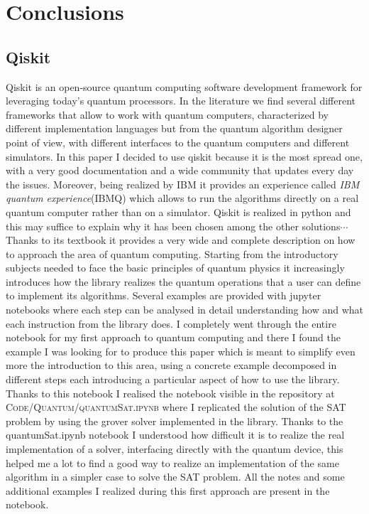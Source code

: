 \documentclass[english]{article}
\begin{document}
	\section{Conclusions}
	\label{sec:conclusions}
	
	\clearpage
	\begin{appendices}
		\section{Qiskit}
		\label{sec:qiskit}
			Qiskit is an open-source quantum computing software development framework for leveraging today's quantum processors. In the literature we find several different frameworks that allow to work with quantum computers, characterized by different implementation languages but from the quantum algorithm designer point of view, with different interfaces to the quantum computers and different simulators. In this paper I decided to use qiskit because it is the most spread one, with a very good documentation and a wide community that updates every day the issues. Moreover, being realized by IBM it provides an experience called \emph{IBM quantum experience}(IBMQ) which allows to run the algorithms directly on a real quantum computer rather than on a simulator. Qiskit is realized in python and this may suffice to explain why it has been chosen among the other solutions$\cdots$\\
			
			Thanks to its textbook \cite{qiskitTextbook} it provides a very wide and complete description on how to approach the area of quantum computing. Starting from the introductory subjects needed to face the basic principles of quantum physics it increasingly introduces how the library realizes the quantum operations that a user can define to implement its algorithms. Several examples are provided with jupyter notebooks where each step can be analysed in detail understanding how and what each instruction from the library does. I completely went through the entire notebook for my first approach to quantum computing and there I found the example I was looking for to produce this paper which is meant to simplify even more the introduction to this area, using a concrete example decomposed in different steps each introducing a particular aspect of how to use the library. Thanks to this notebook I realised the notebook visible in the repository at \textsc{Code/Quantum/quantumSat.ipynb} where I replicated the solution of the SAT problem by using the grover solver implemented in the library. Thanks to the quantumSat.ipynb notebook I understood how difficult it is to realize the real implementation of a solver, interfacing directly with the quantum device, this helped me a lot to find a good way to realize an implementation of the same algorithm in a simpler case to solve the SAT problem. All the notes and some additional examples I realized during this first approach are present in the notebook. \\
			

\end{appendices}
\end{document}
